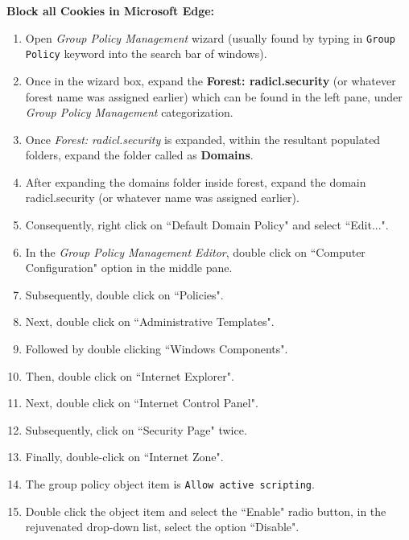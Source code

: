 \documentclass[12pt]{extarticle}
\newcommand{\ben}{\begin{enumerate}}
\newcommand{\een}{\end{enumerate}}
\begin{document}
		
		\vspace{4mm}
		\textbf{Block all Cookies in Microsoft Edge:}
		\ben
		
			\item Open \textit{Group Policy Management} wizard (usually found by typing in \texttt{Group Policy} keyword into the search bar of windows).
			\item Once in the wizard box, expand the \textbf{Forest: radicl.security} (or whatever forest name was assigned earlier) which can be found in the left pane, under \textit{Group Policy Management} categorization.
			\item Once \textit{Forest: radicl.security} is expanded, within the resultant populated folders, expand the folder called as \textbf{Domains}.
			\item After expanding the domains folder inside forest, expand the domain radicl.security (or whatever name was assigned earlier).
			\item Consequently, right click on ``Default Domain Policy" and select ``Edit...".
			\item In the \textit{Group Policy Management Editor}, double click on ``Computer Configuration" option in the middle pane.
			\item Subsequently, double click on ``Policies".
			\item Next, double click on ``Administrative Templates".
			\item Followed by double clicking ``Windows Components".
			\item Then, double click on ``Internet Explorer".
			\item Next, double click on ``Internet Control Panel".
			\item Subsequently, click on ``Security Page" twice. 
			\item Finally, double-click on ``Internet Zone".
			\item The group policy object item is \texttt{Allow active scripting}.
			\item Double click the object item and select the ``Enable" radio button, in the rejuvenated drop-down list, select the option ``Disable".
		\een
		
		
		 
\end{document}
